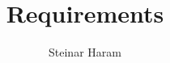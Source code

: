 \documentclass[a4paper,12pt]{article}
\title{Requirements}
\author{Steinar Haram}
\begin{document}
%

\tableofcontents
\listoftables
\listoffigures




\pagebreak
%

%
%
%

%			
%
\end{document}
